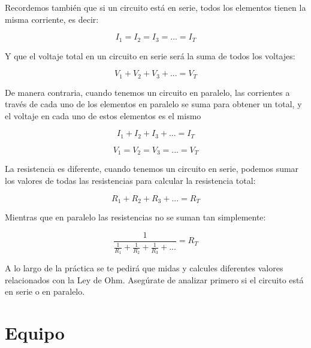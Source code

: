 		Recordemos también que si un circuito está en serie, todos los elementos tienen la misma corriente, es decir:

		\begin{equation}
			I_1 = I_2 = I_3 = ... = I_T
		\end{equation}

		Y que el voltaje total en un circuito en serie será la suma de todos los voltajes:

		\begin{equation}
			V_1 + V_2 + V_3 + ... = V_T
		\end{equation}

		De manera contraria, cuando tenemos un circuito en paralelo, las corrientes a través de cada uno de los elementos en paralelo se suma para obtener un total, y el voltaje en cada uno de estos elementos es el mismo

		\begin{equation}
			I_1 + I_2 + I_3 + ... = I_T
		\end{equation}

		\begin{equation}
			V_1 = V_2 = V_3 = ... = V_T
		\end{equation}

		La resistencia es diferente, cuando tenemos un circuito en serie, podemos sumar los valores de todas las resistencias para calcular la resistencia total:

		\begin{equation}
			R_1 + R_2 + R_3 + ... = R_T
		\end{equation}

		Mientras que en paralelo las resistencias no se suman tan simplemente:

		\begin{equation}
			\frac{1}{\frac{1}{R_1} + \frac{1}{R_2} + \frac{1}{R_3} + ...} = R_T
		\end{equation}

		A lo largo de la práctica se te pedirá que midas y calcules diferentes valores relacionados con la Ley de Ohm. Asegúrate de analizar primero si el circuito está en serie o en paralelo.


\section{Equipo}

